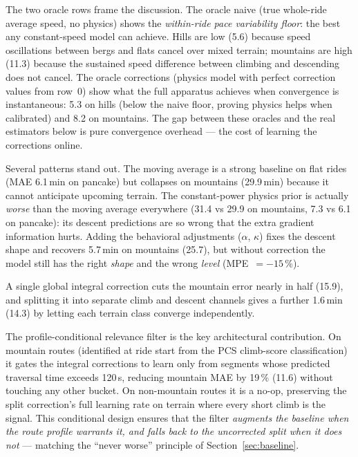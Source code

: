 \documentclass[11pt,a4paper]{article}
\begin{document}
The two oracle rows frame the discussion. The oracle naive (true
whole-ride average speed, no physics) shows the \emph{within-ride pace
variability floor}: the best any constant-speed model can achieve.
Hills are low (5.6) because speed oscillations between bergs and flats
cancel over mixed terrain; mountains are high (11.3) because the
sustained speed difference between climbing and descending does not
cancel. The oracle corrections (physics model with perfect correction
values from row~0) show what the full apparatus achieves when
convergence is instantaneous: 5.3 on hills (below the naive floor,
proving physics helps when calibrated) and 8.2 on mountains. The gap
between these oracles and the real estimators below is pure
convergence overhead --- the cost of learning the corrections online.

Several patterns stand out. The moving average is a strong baseline on
flat rides (MAE 6.1\,min on pancake) but collapses on mountains
(29.9\,\si{\minute}) because it cannot anticipate upcoming terrain.
The constant-power physics prior is actually \emph{worse} than the
moving average everywhere (31.4 vs 29.9 on mountains, 7.3 vs 6.1 on
pancake): its descent predictions are so wrong that the extra gradient
information hurts. Adding the behavioral adjustments ($\alpha$,
$\kappa$) fixes the descent shape and recovers 5.7\,\si{\minute} on
mountains (25.7), but without correction the model still has the right
\emph{shape} and the wrong \emph{level} (MPE~$= -15$\,\%).

A single global integral correction cuts the mountain error nearly in
half (15.9), and splitting it into separate climb and descent channels
gives a further 1.6\,\si{\minute} (14.3) by letting each terrain class
converge independently.

The profile-conditional relevance filter is the key architectural
contribution. On mountain routes (identified at ride start from the
PCS climb-score classification) it gates the integral corrections to
learn only from segments whose predicted traversal time exceeds
120\,\si{\second}, reducing mountain MAE by 19\,\% (11.6) without
touching any other bucket. On non-mountain routes it is a no-op,
preserving the split correction's full learning rate on terrain where
every short climb is the signal. This conditional design ensures
that the filter \emph{augments the baseline when the route profile
warrants it, and falls back to the uncorrected split when it does
not} --- matching the ``never worse'' principle of
Section~\ref{sec:baseline}.
\end{document}
